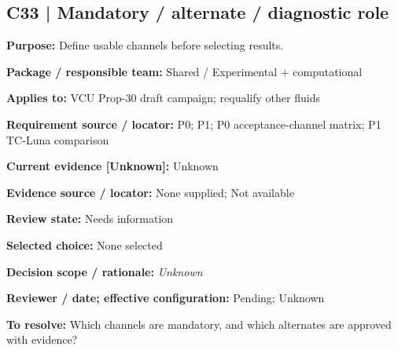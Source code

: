 \documentclass[11pt]{article}
\begin{document}
\begin{minipage}{\textwidth}\small\setlength{\parskip}{2pt}
\subsection*{C33 | Mandatory / alternate / diagnostic role}
\textbf{Purpose:} Define usable channels before selecting results.\par
\textbf{Package / responsible team:} Shared / Experimental + computational\par
\textbf{Applies to:} VCU Prop-30 draft campaign; requalify other fluids\par
\textbf{Requirement source / locator:} P0; P1; P0 acceptance-channel matrix; P1 TC-Luna comparison\par
\textbf{Current evidence [Unknown]:} Unknown\par
\textbf{Evidence source / locator:} None supplied; Not available\par
\textbf{Review state:} Needs information\par
\textbf{Selected choice:} None selected\par
\textbf{Decision scope / rationale:} \textit{Unknown}\par
\textbf{Reviewer / date; effective configuration:} Pending; Unknown\par
\textbf{To resolve:} Which channels are mandatory, and which alternates are approved with evidence?\par
\end{minipage}\par\vspace{5pt}
\end{document}

